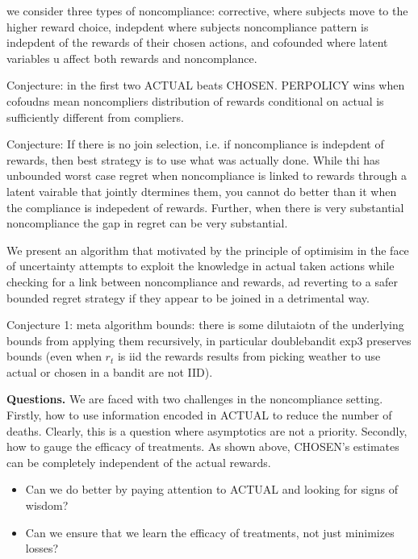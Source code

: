 


we consider three types of noncompliance: corrective, where subjects move to the higher reward choice, indepdent where subjects noncompliance pattern is indepdent of the rewards of their chosen actions, and cofounded where latent variables u affect both rewards and noncomplance.

Conjecture: in the first two ACTUAL beats CHOSEN. PERPOLICY wins when cofoudns mean noncompliers distribution of rewards conditional on actual is sufficiently different from compliers.





Conjecture: If there is no join selection, i.e. if noncompliance is indepdent of rewards, then best strategy is to use what was actually done. While thi has unbounded worst case regret when noncompliance is linked to rewards through a latent vairable that jointly dtermines them, you cannot do better than it when the compliance is indepedent of rewards. Further, when there is very substantial noncompliance the gap in regret can be very substantial.

We present an algorithm that motivated by the principle of optimisim in the face of uncertainty attempts to exploit the knowledge in actual taken actions while checking for a link between noncompliance and rewards, ad reverting to a safer bounded regret strategy if they appear to be joined in a detrimental way. 

 Conjecture 1: meta algorithm bounds: there is some dilutaiotn of the underlying bounds from applying them recursively, in particular doublebandit exp3 preserves bounds (even when $r_t$ is iid the rewards results from picking weather to use actual or chosen in a bandit are not IID). 




	 \textbf{Questions.}
	We are faced with two challenges in the noncompliance setting. Firstly, how to use information encoded in ACTUAL to reduce the number of deaths. Clearly, this is a question where asymptotics are not a priority. Secondly, how to gauge the efficacy of treatments. As shown above, CHOSEN's estimates can be completely independent of the actual rewards.
	\begin{itemize}
		\item Can we do better by paying attention to ACTUAL and looking for signs of wisdom?
		\item Can we ensure that we learn the efficacy of treatments, not just minimizes losses?
	\end{itemize}



